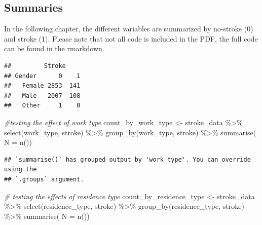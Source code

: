 \documentclass[
]{article}
\newenvironment{Shaded}{\begin{snugshade}}{\end{snugshade}}
\newcommand{\AttributeTok}[1]{\textcolor[rgb]{0.77,0.63,0.00}{#1}}
\newcommand{\CommentTok}[1]{\textcolor[rgb]{0.56,0.35,0.01}{\textit{#1}}}
\newcommand{\FunctionTok}[1]{\textcolor[rgb]{0.00,0.00,0.00}{#1}}
\newcommand{\NormalTok}[1]{#1}
\newcommand{\OtherTok}[1]{\textcolor[rgb]{0.56,0.35,0.01}{#1}}
\newcommand{\SpecialCharTok}[1]{\textcolor[rgb]{0.00,0.00,0.00}{#1}}
\newcommand{\StringTok}[1]{\textcolor[rgb]{0.31,0.60,0.02}{#1}}
\renewcommand{\=}[1]{\stackrel{#1}{=}}
\theoremstyle{definition}
\theoremstyle{remark}
\begin{document}
\hypertarget{summaries}{%
\subsection{Summaries}\label{summaries}}

In the following chapter, the different variables are summarized by no-stroke (0) and stroke (1). Please note that not all code is included in the PDF, the full code can be found in the rmarkdown.

\begin{Shaded}
\end{Shaded}

\begin{verbatim}
##         Stroke
## Gender      0    1
##   Female 2853  141
##   Male   2007  108
##   Other     1    0
\end{verbatim}

\begin{Shaded}
\begin{Highlighting}[]
\CommentTok{\#testing the effect of work type}
\NormalTok{ count\_by\_work\_type }\OtherTok{\textless{}{-}}\NormalTok{ stroke\_data }\SpecialCharTok{\%\textgreater{}\%} 
   \FunctionTok{select}\NormalTok{(work\_type, stroke) }\SpecialCharTok{\%\textgreater{}\%} 
   \FunctionTok{group\_by}\NormalTok{(work\_type, stroke) }\SpecialCharTok{\%\textgreater{}\%}
   \FunctionTok{summarise}\NormalTok{( }\AttributeTok{N =} \FunctionTok{n}\NormalTok{())}
\end{Highlighting}
\end{Shaded}

\begin{verbatim}
## `summarise()` has grouped output by 'work_type'. You can override using the
## `.groups` argument.
\end{verbatim}

\begin{Shaded}
\begin{Highlighting}[]
 \CommentTok{\# testing the effects of residence type}
\NormalTok{count\_by\_residence\_type }\OtherTok{\textless{}{-}}\NormalTok{ stroke\_data }\SpecialCharTok{\%\textgreater{}\%} 
   \FunctionTok{select}\NormalTok{(residence\_type, stroke) }\SpecialCharTok{\%\textgreater{}\%} 
   \FunctionTok{group\_by}\NormalTok{(residence\_type, stroke) }\SpecialCharTok{\%\textgreater{}\%}
   \FunctionTok{summarise}\NormalTok{( }\AttributeTok{N =} \FunctionTok{n}\NormalTok{())}
\end{Highlighting}
\end{Shaded}
\end{document}
